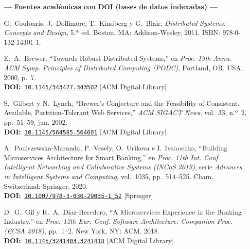 \documentclass[12pt,a4paper]{article}
\begin{document}
\vspace{0.5cm}
\noindent\textbf{\color{azulP}--- Fuentes acad\'emicas con DOI (bases de datos indexadas) ---}
\vspace{0.2cm}

\begin{enumerate}[leftmargin=0.6cm, label={[\arabic*]}, itemsep=6pt]

  \item G.~Coulouris, J.~Dollimore, T.~Kindberg y G.~Blair,
        \textit{Distributed Systems: Concepts and Design}, 5.ª~ed.
        Boston, MA: Addison-Wesley, 2011.
        ISBN: 978-0-132-14301-1.

  \item E.~A.~Brewer,
        ``Towards Robust Distributed Systems,''
        en \textit{Proc. 19th Annu. ACM Symp. Principles of Distributed
        Computing (PODC)}, Portland, OR, USA, 2000, p.~7.\\
        \textbf{DOI:}~\href{https://doi.org/10.1145/343477.343502}%
        {\texttt{10.1145/343477.343502}} \textnormal{[ACM Digital Library]}

  \item S.~Gilbert y N.~Lynch,
        ``Brewer's Conjecture and the Feasibility of Consistent, Available,
        Partition-Tolerant Web Services,''
        \textit{ACM SIGACT News}, vol.~33, n.º~2, pp.~51--59, jun. 2002.\\
        \textbf{DOI:}~\href{https://doi.org/10.1145/564585.564601}%
        {\texttt{10.1145/564585.564601}} \textnormal{[ACM Digital Library]}

  \item A.~Poniszewska-Maranda, P.~Vesely, O.~Urikova e I.~Ivanochko,
        ``Building Microservices Architecture for Smart Banking,''
        en \textit{Proc. 11th Int. Conf. Intelligent Networking and
        Collaborative Systems (INCoS 2019)}, serie \textit{Advances in
        Intelligent Systems and Computing}, vol.~1035, pp.~514--525.
        Cham, Switzerland: Springer, 2020.\\
        \textbf{DOI:}~\href{https://doi.org/10.1007/978-3-030-29035-1_52}%
        {\texttt{10.1007/978-3-030-29035-1\_52}} \textnormal{[Springer]}

  \item D.~G.~Gil y R.~A.~Diaz-Heredero,
        ``A Microservices Experience in the Banking Industry,''
        en \textit{Proc. 12th Eur. Conf. Software Architecture: Companion
        Proc. (ECSA 2018)}, pp.~1--2. New York, NY: ACM, 2018.\\
        \textbf{DOI:}~\href{https://doi.org/10.1145/3241403.3241418}%
        {\texttt{10.1145/3241403.3241418}} \textnormal{[ACM Digital Library]}


\end{enumerate}
\end{document}
